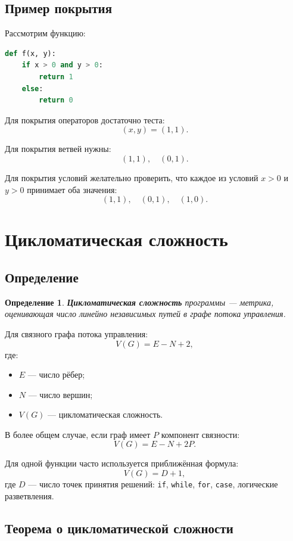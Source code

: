 \documentclass[12pt,a4paper]{article}
\newtheorem{definition}{Определение}
\begin{document}
\subsection{Пример покрытия}

Рассмотрим функцию:

\begin{lstlisting}[language=Python]
def f(x, y):
    if x > 0 and y > 0:
        return 1
    else:
        return 0
\end{lstlisting}

Для покрытия операторов достаточно теста:
\[
(x,y)=(1,1).
\]

Для покрытия ветвей нужны:
\[
(1,1),\quad (0,1).
\]

Для покрытия условий желательно проверить, что каждое из условий $x>0$ и $y>0$ принимает оба значения:
\[
(1,1),\quad (0,1),\quad (1,0).
\]

\section{Цикломатическая сложность}

\subsection{Определение}

\begin{definition}
\textbf{Цикломатическая сложность} программы --- метрика, оценивающая число линейно независимых путей в графе потока управления.
\end{definition}

Для связного графа потока управления:
\[
V(G) = E - N + 2,
\]
где:
\begin{itemize}
    \item $E$ --- число рёбер;
    \item $N$ --- число вершин;
    \item $V(G)$ --- цикломатическая сложность.
\end{itemize}

В более общем случае, если граф имеет $P$ компонент связности:
\[
V(G) = E - N + 2P.
\]

Для одной функции часто используется приближённая формула:
\[
V(G) = D + 1,
\]
где $D$ --- число точек принятия решений: \texttt{if}, \texttt{while}, \texttt{for}, \texttt{case}, логические разветвления.

\subsection{Теорема о цикломатической сложности}
\end{document}
